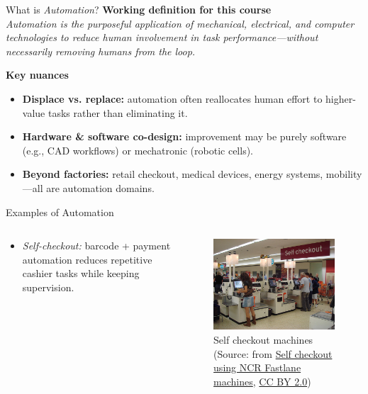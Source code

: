 \begin{frame}{What is \textit{Automation}?}
\textbf{Working definition for this course}\\[2mm]
\emph{Automation is the purposeful application of mechanical, electrical, and computer technologies to reduce human involvement in task performance—without necessarily removing humans from the loop.}

\vspace{2mm}
\textbf{Key nuances}
\begin{itemize}
  \item \textbf{Displace vs. replace:} automation often reallocates human effort to higher-value tasks rather than eliminating it.
  \item \textbf{Hardware \& software co-design:} improvement may be purely software (e.g., CAD workflows) or mechatronic (robotic cells).
  \item \textbf{Beyond factories:} retail checkout, medical devices, energy systems, mobility—all are automation domains.
\end{itemize}

\end{frame}

\begin{frame}{Examples of Automation}
	\begin{columns}
		\begin{column}{0.25\textwidth}
			\begin{itemize}
  				\item \emph{Self-checkout:} barcode + payment automation reduces repetitive cashier tasks while keeping supervision.
			\end{itemize}
		\end{column}
		\begin{column}{0.75\textwidth}
				\begin{figure}
				\centering
				\includegraphics[width=0.7\linewidth]{fig/lec01/Self_checkout.jpg}
				\caption*{Self checkout machines (Source: from \href{https://commons.wikimedia.org/wiki/File:Self_checkout_using_NCR_Fastlane_machines.jpg}{Self checkout using NCR Fastlane machines}, \href{https://creativecommons.org/licenses/by/2.0/deed.en}{CC BY 2.0})}
			\end{figure}
		\end{column}
\end{columns}
\end{frame}

